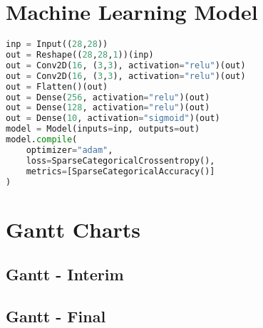 \chapter{Machine Learning Model} \label{ap:model}
\begin{lstlisting}[language=Python]
inp = Input((28,28))
out = Reshape((28,28,1))(inp)
out = Conv2D(16, (3,3), activation="relu")(out)
out = Conv2D(16, (3,3), activation="relu")(out)
out = Flatten()(out)
out = Dense(256, activation="relu")(out)
out = Dense(128, activation="relu")(out)
out = Dense(10, activation="sigmoid")(out)
model = Model(inputs=inp, outputs=out)
model.compile(
	optimizer="adam",
	loss=SparseCategoricalCrossentropy(),
	metrics=[SparseCategoricalAccuracy()]
)
\end{lstlisting}

\chapter{Gantt Charts}
\newpage
\section{Gantt - Interim} \label{gc-interim}
\begin{center}
\end{center}

\section{Gantt - Final} \label{gc-final}
\begin{center}
\end{center}